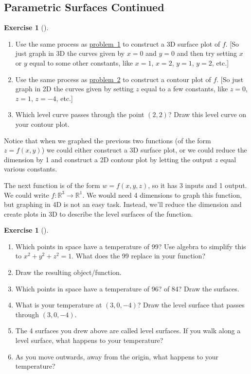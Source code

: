 \documentclass[10pt,]{book}
\theoremstyle{plain}
\theoremstyle{definition}
\theoremstyle{definition}
\theoremstyle{definition}
\theoremstyle{definition}
\newtheorem{exploration}[project]{Exercise}
\theoremstyle{definition}
\numberwithin{equation}{section}
\begin{document}
\subsection[{Parametric Surfaces Continued}]{Parametric Surfaces Continued}\label{subsection-24}
\begin{exploration}[]\label{exploration-113}
\leavevmode%
\begin{enumerate}[font=\bfseries,label=(\alph*),ref=\alph*]
\item\label{task-219} Use the same process as \hyperref[prob_3dsurface_plot]{problem~1} to construct a 3D surface plot of \(f\). [So just graph in 3D the curves given by \(x=0\) and \(y=0\) and then try setting \(x\) or \(y\) equal to some other constants, like \(x=1\), \(x=2\), \(y=1\), \(y=2\), etc.]%
\item\label{task-220} Use the same process as \hyperref[prob_intro_to_contour_plots]{problem~2} to construct a contour plot of \(f\). [So just graph in 2D the curves given by setting \(z\) equal to a few constants, like \(z=0\), \(z=1\), \(z=-4\), etc.]%
\item\label{task-221} Which level curve passes through the point \((2,2)\)?  Draw this level curve on your contour plot.%
\end{enumerate}
\end{exploration}
Notice that when we graphed the previous two functions (of the form \(z=f(x,y)\)) we could either construct a 3D surface plot, or we could reduce the dimension by 1 and construct a 2D contour plot by letting the output \(z\) equal various constants.%
\par
The next function is of the form \(w=f(x,y,z)\), so it has 3 inputs and 1 output. We could write \(f\colon \mathbb{R}^3\to\mathbb{R}^1\). We would need 4 dimensions to graph this function, but graphing in 4D is not an easy task. Instead, we'll reduce the dimension and create plots in 3D to describe the level surfaces of the function.%
\begin{exploration}[]\label{exploration-114}
\leavevmode%
\begin{enumerate}[font=\bfseries,label=(\alph*),ref=\alph*]
\item\label{task-222} Which points in space have a temperature of 99? Use algebra to simplify this to \(x^2+y^2+z^2=1\). What does the 99 replace in your function?%
%
\item\label{task-223} Draw the resulting object/function.%
\item\label{task-224} Which points in space have a temperature of 96? of 84? Draw the surfaces.%
\item\label{task-225} What is your temperature at \((3,0,-4)\)? Draw the level surface that passes through \((3,0,-4)\).%
\item\label{task-226} The 4 surfaces you drew above are called level surfaces. If you walk along a level surface, what happens to your temperature?%
\item\label{task-227} As you move outwards, away from the origin, what happens to your temperature?%
\end{enumerate}
\end{exploration}
\end{document}
